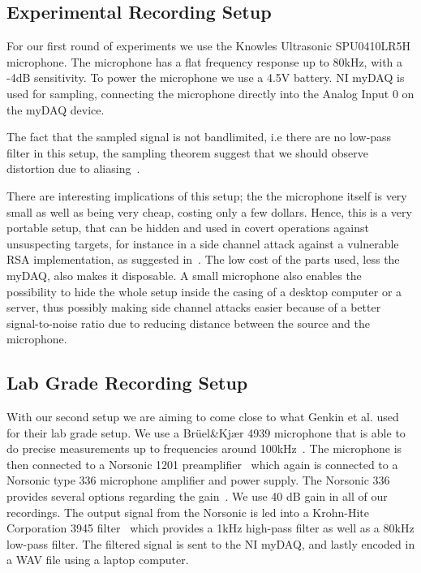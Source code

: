 \subsection{Experimental Recording Setup}\label{chp3:sec:knowles_configuration}
For our first round of experiments we use the Knowles Ultrasonic SPU0410LR5H microphone.
The microphone has a flat frequency response up to 80kHz, with a -4dB sensitivity\cite{url:knowles_spec}.
To power the microphone we use a 4.5V battery.
\gls{NI} myDAQ is used for sampling, connecting the microphone directly into the Analog Input 0 on the myDAQ device.

The fact that the sampled signal is not bandlimited, i.e there are no low-pass filter in this setup, the sampling theorem suggest that we should observe distortion due to aliasing~\cite{proakis2007digital}.

There are interesting implications of this setup; the the microphone itself is very small as well as being very cheap, costing only a few dollars. 
Hence, this is a very portable setup, that can be hidden and used in covert operations against unsuspecting targets, for instance in a side channel attack against a vulnerable RSA implementation, as suggested in~\cite{DBLP:conf/crypto/GenkinST14}.
The low cost of the parts used, less the myDAQ, also makes it disposable.
A small microphone also enables the possibility to hide the whole setup inside the casing of a desktop computer or a server, thus possibly making side channel attacks easier because of a better signal-to-noise ratio due to reducing distance between the source and the microphone.


\subsection{Lab Grade Recording Setup}\label{chp3:sec:bruel_kjaer_configuration}
With our second setup we are aiming to come close to what Genkin et al. used for their lab grade setup.
We use a Brüel\&Kjær 4939 microphone that is able to do precise measurements up to frequencies around 100kHz~\cite{url:bk4939_spec}.
The microphone is then connected to a Norsonic 1201 preamplifier~\cite{url:norsonic1201_spec} which again is connected to a Norsonic type 336 microphone amplifier and power supply.
The Norsonic 336 provides several options regarding the gain~\cite{url:nor336_spec}. 
We use 40 dB gain in all of our recordings.
The output signal from the Norsonic is led into a Krohn-Hite Corporation 3945 filter~\cite{url:krohn-hite3945_spec} which provides a 1kHz high-pass filter as well as a 80kHz low-pass filter.
The filtered signal is sent to the \gls{NI} myDAQ, and lastly encoded in a WAV file using a laptop computer. 

